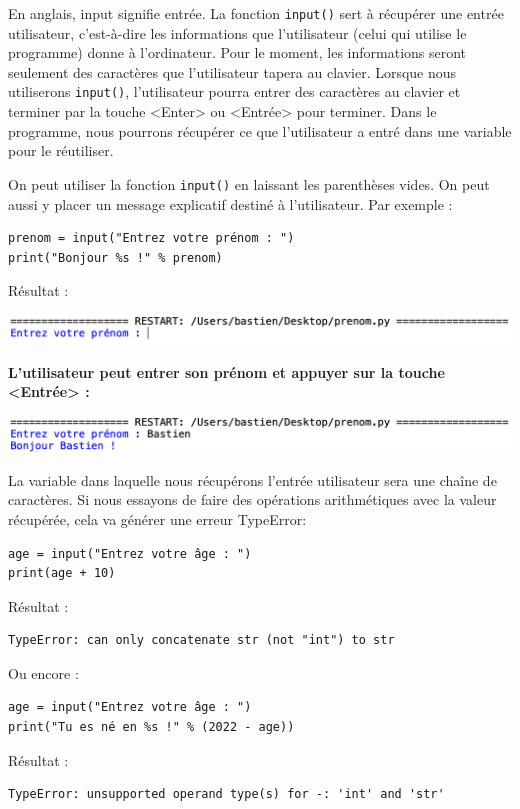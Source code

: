 \documentclass[11pt]{article}
\begin{document}
En anglais, \og input\fg{} signifie \og entrée\fg{}. La fonction \texttt{input()} sert à récupérer une \og entrée utilisateur\fg{}, c'est-à-dire les informations que l'utilisateur (celui qui utilise le programme) donne à l'ordinateur. Pour le moment, les informations seront seulement des caractères que l'utilisateur tapera au clavier. Lorsque nous utiliserons \texttt{input()}, l'utilisateur pourra entrer des caractères au clavier et terminer par la touche <Enter> ou <Entrée> pour terminer. Dans le programme, nous pourrons récupérer ce que l'utilisateur a entré dans une variable pour le réutiliser.

On peut utiliser la fonction \texttt{input()} en laissant les parenthèses vides. On peut aussi y placer un message explicatif destiné à l'utilisateur. Par exemple :
\begin{verbatim}
prenom = input("Entrez votre prénom : ")
print("Bonjour %s !" % prenom)
\end{verbatim}

Résultat :
\begin{center}
\includegraphics[width=.9\linewidth]{./img/example_prenom1.png}
\end{center}

\textbf{L'utilisateur peut entrer son prénom et appuyer sur la touche <Entrée> :}

\begin{center}
\includegraphics[width=.9\linewidth]{./img/example_prenom2.png}
\end{center}

La variable dans laquelle nous récupérons l'entrée utilisateur sera une chaîne de caractères. Si nous essayons de faire des opérations arithmétiques avec la valeur récupérée, cela va générer une erreur \og TypeError\fg{}:
\begin{verbatim}
age = input("Entrez votre âge : ")
print(age + 10)
\end{verbatim}
Résultat :
\begin{verbatim}
TypeError: can only concatenate str (not "int") to str
\end{verbatim}

Ou encore :
\begin{verbatim}
age = input("Entrez votre âge : ")
print("Tu es né en %s !" % (2022 - age))
\end{verbatim}
Résultat :
\begin{verbatim}
TypeError: unsupported operand type(s) for -: 'int' and 'str'
\end{verbatim}
\end{document}
